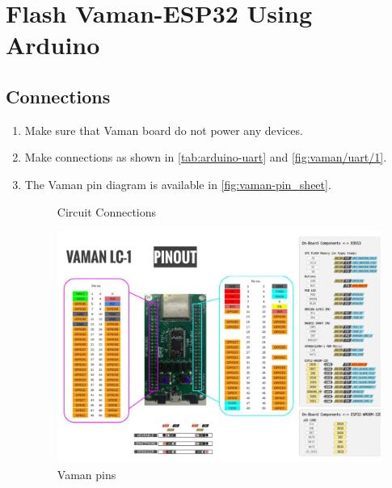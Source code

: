 \section{Flash Vaman-ESP32 Using Arduino}
\subsection{Connections}
\begin{enumerate}
\item Make sure that Vaman board do not power any devices.  
\item Make connections as shown in \autoref{tab:arduino-uart} and \autoref{fig:vaman/uart/1}. 
\item The Vaman pin diagram is available in \autoref{fig:vaman-pin_sheet}.
\begin{figure}[!ht]
\centering

\caption{Circuit Connections}
\label{fig:vaman/uart/1}
\end{figure}
\begin{figure}
\centering
\includegraphics[width=\columnwidth]{vaman-esp32/lcd/figs/pin_sheet.png}
\caption{Vaman pins}
\label{fig:vaman-pin_sheet}
\end{figure}
\begin{table}[!ht]

\caption{}
\label{tab:arduino-uart}
\end{table}
\end{enumerate}
